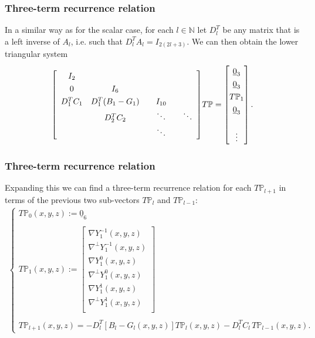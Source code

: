 \documentclass[10pt]{beamer}
\newcommand{\N}{\mathbb{N}}
\newcommand{\gradP}{T\mathbb{P}}
\newcommand{\gradPl}{T\mathbb{P}_l}
\newcommand{\gradY}{\nabla Y}
\newcommand{\gradpY}{\nabla^\perp Y}
\newcommand{\Dlt}{D^T_l}
\begin{document}
\frame
{
    \frametitle{Three-term recurrence relation}

In a similar way as for the scalar case, for each \(l \in \N\) let \(\Dlt\) be any matrix that is a left inverse of \(A_l\), i.e. such that \(\Dlt A_l = I_{2(2l+3)}\). We can then obtain the lower triangular system
\begin{align}
\renewcommand\arraystretch{1.3}
\mleft[
\begin{array}{cccc}
		I_2 \\
		0 & I_6 & & \\
		D^T_1 C_1 & D^T_1(B_1-G_1) & \quad I_{10} \quad & \\
		& D^T_2 C_2 & \ddots & \ddots \\
		& & \ddots &
\end{array}
\mright]
\gradP
=
\begin{bmatrix}
	\underline{0}_3 \\ \underline{0}_3 \\ \gradP_1 \\ \underline{0}_3 \\ \\ \vdots \\
\end{bmatrix}.
\end{align}

}

\frame
{
    \frametitle{Three-term recurrence relation}

Expanding this we can find a three-term recurrence relation for each \(\gradP_{l+1}\) in terms of the previous two sub-vectors \(\gradPl\) and \(\gradP_{l-1}\):
\begin{align}
\begin{cases}
\gradP_{0}(x,y,z) := \underline{0}_6 \\
\\
\gradP_{1}(x,y,z) := \begin{bmatrix}
				\gradY_1^{-1}(x,y,z) \\ \gradpY_1^{-1}(x,y,z) \\ \gradY_1^{0}(x,y,z) \\ \gradpY_1^{0}(x,y,z) \\ \gradY_1^{1}(x,y,z) \\ \gradpY_1^{1}(x,y,z) \\
			\end{bmatrix} \\
\\
\gradP_{l+1}(x,y,z) = -\Dlt [B_l-G_l(x,y,z)] \gradPl(x,y,z) - \Dlt C_l  \,\gradP_{l-1}(x,y,z).
\end{cases}
\end{align}
}
\end{document}
